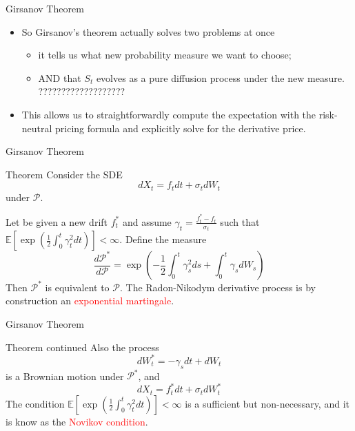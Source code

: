 \documentclass{beamer}
\begin{document}
\begin{frame}{Girsanov Theorem}
	\begin{itemize}
		\item So Girsanov's theorem actually solves two problems at once
        \begin{itemize}
    		\item it tells us what new probability measure we want to choose;
    		\item AND that $S_t$ evolves as a pure diffusion process under the new measure. ???????????????????
        \end{itemize}
		\item This allows us to straightforwardly compute the expectation with the risk-neutral pricing formula and explicitly solve for the derivative price.
	\end{itemize}
\end{frame}

\begin{frame}{Girsanov Theorem}
	\begin{block}{Theorem}
	Consider the SDE 
	\begin{equation*}
		dX_t = f_t dt + \sigma_t dW_t
	\end{equation*}
	under $\mathcal{P}$. 
	
	Let be given a new drift $f^*_t$ and assume $\gamma_t=\frac{f_t^*-f_t}{\sigma_t}$ such that $\mathbb{E}\left[\exp\left(\frac{1}{2}\int_0^t\gamma_t^2dt\right)\right]<\infty$.
	Define the measure 
	\begin{equation}
	\frac{d\mathcal{P}^*}{d\mathcal{P}}=\exp\left(-\frac{1}{2}\int_0^t \gamma_s^2 ds + \int_0^t \gamma_s dW_s \right)
	\end{equation}
	Then $\mathcal{P}^*$ is equivalent to $\mathcal{P}$. 
	The Radon-Nikodym derivative process is by construction an \textcolor{red}{exponential martingale}.
	\end{block}
\end{frame}

\begin{frame}{Girsanov Theorem}
	\begin{block}{Theorem continued}
		Also the process
		\begin{equation}
			dW^*_t = -\gamma_s dt + dW_t
		\end{equation} 
		is a Brownian motion under $\mathcal{P}^*$, and 
		\begin{equation*}
			dX_t = f^*_t dt + \sigma_t dW^*_t
		\end{equation*}
	The condition $\mathbb{E}\left[\exp\left(\frac{1}{2}\int_0^t\gamma_t^2dt\right)\right]<\infty$ is a sufficient but non-necessary, and it is know as the \textcolor{red}{Novikov condition}.
	\end{block}
\end{frame}
\end{document}
